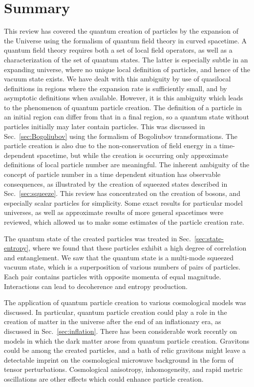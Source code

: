 \documentclass[12pt,onecolumn,eqsecnum,floats,aps,prd,floatfix,titlepage,tightenlines]{revtex4-2}
\begin{document}
\section{Summary}
\label{sec:final}

This review has covered  the quantum creation of particles by the  expansion of the Universe using the formalism of quantum field theory in curved
spacetime. A quantum field theory requires both a set of local field operators, as well as a characterization of the set of quantum states. The latter
is especially subtle in an expanding universe, where no unique local definition of particles, and hence of the vacuum state exists. We have dealt with 
this ambiguity by use of quasilocal definitions in regions where the expansion rate is sufficiently small, and by asymptotic definitions when
available. However, it is this ambiguity which leads to the phenomenon of quantum particle creation. The definition of a particle in an initial region
can differ from that in a final region, so a quantum state without particles initially may later contain particles. This was discussed in Sec.~\ref{sec:Bogoliubov}
using the formalism of Bogoliubov transformations. The particle creation is also due to the non-conservation of field energy in a time-dependent
spacetime, but while the creation is occurring only approximate definitions of local particle number are meaningful. The inherent ambiguity of the
concept of particle number in a time dependent situation has observable consequences, as illustrated by the creation of squeezed states described
in Sec.~\ref{sec:squeeze}.
This review has concentrated on the creation of bosons, and especially scalar particles for
simplicity. Some exact results for particular model universes, as well as approximate results of more general spacetimes were reviewed, which 
allowed us to make some estimates of the particle creation rate. 

The quantum state of the created particles was treated in Sec.~\ref{sec:state-entropy}, where we found that these particles exhibit a high degree
of correlation and entanglement. We saw that the quantum state is a multi-mode squeezed vacuum state, which is a superposition of various numbers of
pairs of particles. Each pair contains particles with opposite momenta of equal magnitude. Interactions can lead to decoherence and entropy production.

The application of quantum particle creation to various cosmological models was discussed. In particular, quantum particle creation could play a role in the 
creation of matter in the universe after the end of an inflationary era, as discussed in Sec.~\ref{sec:inflation}.  There has been considerable work recently 
on models in which the dark matter arose from quantum particle creation.  Gravitons could be among the created particles, and a bath of relic gravitons
might leave a detectable imprint on the cosmological microwave background in the form of tensor perturbations. Cosmological anisotropy, inhomogeneity,
and rapid metric oscillations are other effects which could enhance particle creation.
\end{document}
